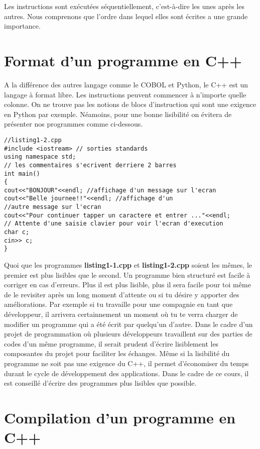 \documentclass[a4paper, oneside,11pt]{book}
\begin{document}
Les instructions sont ex\'ecut\'ees s\'equentiellement, c'est-\`a-dire les unes apr\`es les autres. Nous comprenons que l'ordre dans lequel elles sont \'ecrites a une grande importance.

\section{Format d'un  programme en C++}
A la diff\'erence des autres langage comme le COBOL et Python, le C++ est un langage \`a format libre. Les instructions peuvent commencer \`a n'importe quelle colonne. 
On ne trouve pas les notions de blocs d'instruction qui sont une exigence en Python par exemple. N\'eamoins, pour une bonne lisibilit\'e on \'evitera de pr\'esenter nos programmes 
comme ci-dessous. 


\begin{lstlisting}
//listing1-2.cpp
#include <iostream> // sorties standards
using namespace std;
// les commentaires s'ecrivent derriere 2 barres
int main()
{
cout<<"BONJOUR"<<endl; //affichage d'un message sur l'ecran
cout<<"Belle journee!!"<<endl; //affichage d'un 
//autre message sur l'ecran
cout<<"Pour continuer tapper un caractere et entrer ..."<<endl;
// Attente d'une saisie clavier pour voir l'ecran d'execution
char c;
cin>> c;
}
\end{lstlisting}

Quoi que les programmes \textbf{listing1-1.cpp} et \textbf{listing1-2.cpp} soient les m\^emes, le premier est plus lisibles que le second. Un programme bien structur\'e est facile \`a 
corriger en cas d'erreurs. Plus il est plus lisible, plus il sera facile pour toi m\^eme de le revisiter apr\`es un long moment d'attente ou si tu d\'esire 
y apporter des am\'eliorations.
Par exemple si tu travaille pour une compagnie en tant que d\'eveloppeur, il arrivera certainnement un moment o\`u  tu te verra charger de modifier un programme qui a \'et\'e \'ecrit
par quelqu'un d'autre. Dans le cadre d'un projet de programmation o\`u plusieurs d\'eveloppeurs travaillent sur des parties de codes d'un m\^eme programme, il serait prudent 
d'\'ecrire lisiblement  les composantes du projet pour faciliter  les \'echanges. M\^eme si la lisibilit\'e du programme ne soit pas une exigence du C++, il permet d'\'economiser du 
temps durant le cycle de d\'eveloppement des applications. Dans le cadre de ce cours, il est conseill\'e d'\'ecrire des programmes plus lisibles que possible.




\section{Compilation d'un programme en C++}
\end{document}
